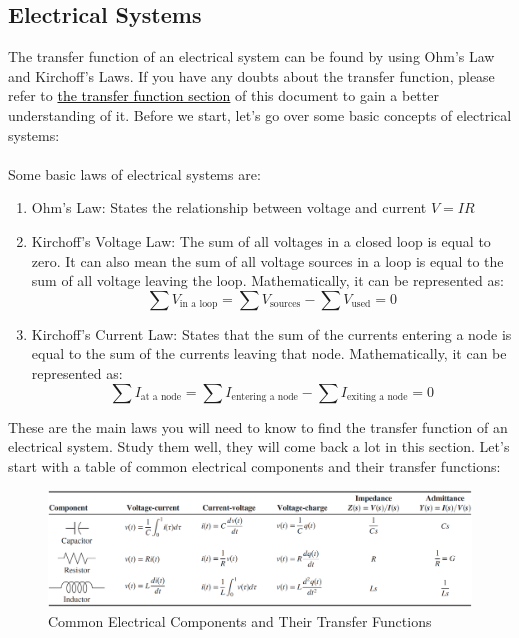 \documentclass{article}
\theoremstyle{mytheoremstyle}
\theoremstyle{mytheoremstyle}
\theoremstyle{myproblemstyle}
\theoremstyle{break}
\begin{document}
\subsection{Electrical Systems}  
The transfer function of an electrical system can be found by using Ohm's Law and Kirchoff's Laws. If you have any doubts about the transfer function, please refer to \hyperref[sec:Transfer_Function]{\textcolor{black}{the transfer function section}} of this document to gain a better understanding of it. Before we start, let's go over some basic concepts of electrical systems:\\\\
Some basic laws of electrical systems are:
\begin{enumerate}
	\item Ohm's Law: States the relationship between voltage and current $V = IR$
	\item Kirchoff's Voltage Law: The sum of all voltages in a closed loop is equal to zero. It can also mean the sum of all voltage sources in a loop is equal to the sum of all voltage  leaving the loop. Mathematically, it can be represented as:
	      \begin{equation}
			\sum V_{\text{in a loop}} = \sum V_{\text{sources}} - \sum V_{\text{used}} = 0
	      \end{equation}
	\item Kirchoff's Current Law: States that the sum of the currents entering a node is equal to the sum of the currents leaving that node. Mathematically, it can be represented as:
	      \begin{equation}
			\sum I_{\text{at a node}} = \sum I_{\text{entering a node}} - \sum I_{\text{exiting a node}} = 0
	      \end{equation}
\end{enumerate}

These are the main laws you will need to know to find the transfer function of an electrical system. Study them well, they will come back a lot in this section.
\newpage Let's start with a table of common electrical components and their transfer functions:

\begin{figure}[h]
	\label{fig:Table For Transfer Functions of Electrical Systems}
	\includegraphics[scale=0.35]{Voltage-Current Table For Transfer Functions}
	\centering
	\caption{Common Electrical Components and Their Transfer Functions}
\end{figure}
\end{document}
